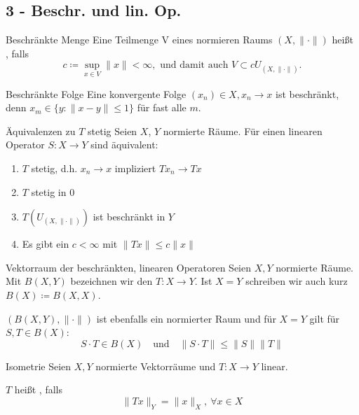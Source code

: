 \subsection*{3 - Beschr. und lin. Op.}

	\begin{karte}{Beschränkte Menge}
		Eine Teilmenge V eines normieren Raums $(X, \| \cdot \|)$ hei{\ss}t , falls 
		\[ c \coloneqq \sup_{x \in V} \| x \| < \infty, \text{ und damit auch } V \subset c U_{(X, \| \cdot \| )} . \]
	\end{karte}
	
	\begin{karte}{Beschränkte Folge}
		Eine konvergente Folge $(x_{n})	\in X, x_{n} \rightarrow x$ ist beschränkt, denn $x_{m} \in \{ y: \| x - y \| \leq 1 \}$ für fast alle $m$.
	\end{karte}	
	
	\begin{karte}{Äquivalenzen zu $T$ stetig}
		Seien $X$, $Y$ normierte Räume. Für einen linearen Operator $S: X \rightarrow Y$ sind äquivalent:
		\begin{enumerate}[label=\alph*\upshape)]
			\item $T$ stetig, d.h. $x_{n} \rightarrow x$ impliziert $Tx_{n} \rightarrow Tx$
			\item $T$ stetig in 0
			\item $T(U_{(X, \| \cdot \|)})$ ist beschränkt in $Y$
			\item Es gibt ein $c < \infty$ mit $\| Tx \| \leq c \| x \|$
		\end{enumerate}
	\end{karte}	
	
	\begin{karte}{Vektorraum der beschränkten, linearen Operatoren}
		Seien $X, Y$ normierte Räume. Mit $B(X, Y)$ bezeichnen wir den  $T: X \rightarrow Y$. Ist $ X = Y$ schreiben wir auch kurz $B(X) \coloneqq B(X, X)$.
		
			$(B(X, Y), \| \cdot \|)$ ist ebenfalls ein normierter Raum und für $X = Y$ gilt für $S, T \in B(X)$:
 		\[ S \cdot T \in B(X) \quad \text{und} \quad \| S \cdotp T \| \leq \| S \| \| T \| \]
	\end{karte}
	
	\begin{karte}{Isometrie}
		Seien $X, Y$ normierte Vektorräume und $T: X \rightarrow Y$ linear.
	
		$T$ hei{\ss}t , falls 
			\[ \| Tx \|_{Y} = \| x \|_{X}, ~ \forall x \in X \]
	\end{karte}
	
